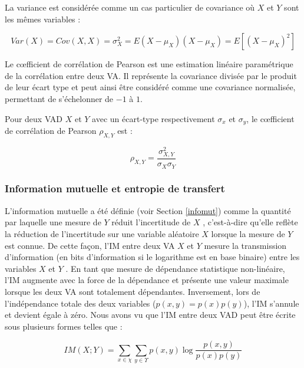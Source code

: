 La variance est considérée comme un cas particulier de covariance où $X$ et $Y$ sont les mêmes variables : 

\begin{equation}
Var (X) = Cov(X,X) = \sigma_X^2 = E(X - \mu_X)(X-\mu_X) = E[(X-\mu_X)^2]
\end{equation}

Le cœfficient de corrélation de Pearson est une estimation linéaire paramétrique de la corrélation entre deux VA. 
Il représente la covariance divisée par le produit de leur écart type et peut ainsi être considéré comme une covariance normalisée, permettant de s'échelonner de $-1$ à $1$. 

Pour deux VAD $X$ et $Y$ avec un écart-type respectivement $\sigma_x$ et $\sigma_y$, le cœfficient de corrélation de Pearson $\rho_{X,Y}$ est :

\begin{equation}
\rho_{X,Y} = \frac{\sigma_{X,Y}^2}{\sigma_X \sigma_Y}
\end{equation}

\subsubsection*{Information mutuelle et entropie de transfert}
\label{algocalculindiceimte}

L'information mutuelle a été définie (voir Section \ref{infomut}) comme la quantité par laquelle une mesure de $Y$ réduit l'incertitude de $X$ \citep{shannon1948, cover2006}, c'est-à-dire qu'elle reflète la réduction de l'incertitude sur une variable aléatoire $X$ lorsque la mesure de $Y$ est connue. 
De cette façon, l'IM entre deux VA $X$ et $Y$ mesure la transmission d'information (en bits d'information si le logarithme est en base binaire) entre les variables $X$ et $Y$ \citep{shannon1948, lenne2013decrease}. 
En tant que mesure de dépendance statistique non-linéaire, l'IM augmente avec la force de la dépendance et présente une valeur maximale lorsque les deux VA sont totalement dépendantes. 
Inversement, lors de l'indépendance totale des deux variables ($p(x,y)=p(x)p(y)$), l'IM s'annule et devient égale à zéro. 
Nous avons vu que l'IM entre deux VAD peut être écrite sous plusieurs formes telles que : 

\begin{equation}
IM(X;Y) = \sum_{x \in \chi} \sum_{y \in \Upsilon} p(x,y) \log \frac{p(x,y)}{p(x)p(y)}
\end{equation}

